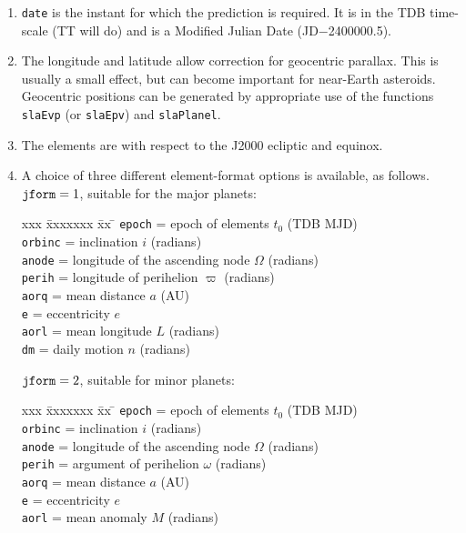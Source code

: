 \documentclass[11pt,fleqn,twoside]{article}
\renewcommand{\_}{{\tt\char'137}}     %
\begin{document}
{
 \begin{enumerate}
  \item {\tt date} is the instant for which the prediction is
        required.  It is in the TDB time-scale (TT will do) and is a
        Modified Julian Date (JD$-$2400000.5).
  \item The longitude and latitude allow correction for geocentric
        parallax.  This is usually a small effect, but can become
        important for near-Earth asteroids.  Geocentric positions
        can be generated by appropriate use of the functions
        {\tt slaEvp} (or {\tt slaEpv}) and {\tt slaPlanel}.
  \item The elements are with respect to the J2000 ecliptic and equinox.
  \item A choice of three different element-format options is available, as
        follows. \\
 
        ${\tt jform}=1$, suitable for the major planets:
 
        \begin{tabbing}
        xxx \= xxxxxxx \= xx \= \kill
        \> {\tt epoch}  \> = \> epoch of elements $t_0$ (TDB MJD) \\
        \> {\tt orbinc} \> = \> inclination $i$ (radians) \\
        \> {\tt anode}  \> = \> longitude of the ascending node $\Omega$ (radians) \\
        \> {\tt perih}  \> = \> longitude of perihelion $\varpi$ (radians) \\
        \> {\tt aorq}   \> = \> mean distance $a$ (AU) \\
        \> {\tt e}      \> = \> eccentricity $e$ \\
        \> {\tt aorl}   \> = \> mean longitude $L$ (radians) \\
        \> {\tt dm}     \> = \> daily motion $n$ (radians)
        \end{tabbing}
 
        ${\tt jform}=2$, suitable for minor planets:
 
        \begin{tabbing}
        xxx \= xxxxxxx \= xx \= \kill
        \> {\tt epoch}  \> = \> epoch of elements $t_0$ (TDB MJD) \\
        \> {\tt orbinc} \> = \> inclination $i$ (radians) \\
        \> {\tt anode}  \> = \> longitude of the ascending node $\Omega$ (radians) \\
        \> {\tt perih}  \> = \> argument of perihelion $\omega$ (radians) \\
        \> {\tt aorq}   \> = \> mean distance $a$ (AU) \\
        \> {\tt e}      \> = \> eccentricity $e$ \\
        \> {\tt aorl}   \> = \> mean anomaly $M$ (radians)
        \end{tabbing}
 

\end{enumerate}}
\end{document}
